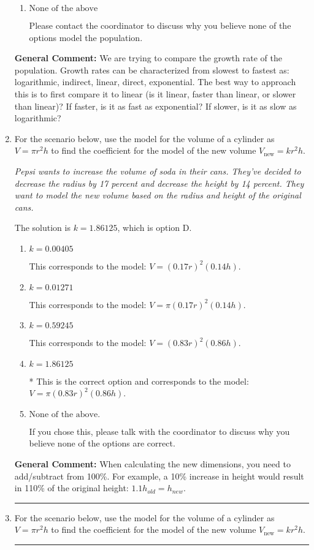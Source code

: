 \documentclass{extbook}[14pt]
\newcommand{\litem}[1]{\item #1

\rule{\textwidth}{0.4pt}}
\begin{document}
\begin{enumerate}
{\begin{enumerate}[label=\Alph*.]
This suggests a growth faster than constant but slower than exponential.
\item \( \text{None of the above} \)

Please contact the coordinator to discuss why you believe none of the options model the population.
\end{enumerate}

\textbf{General Comment:} We are trying to compare the growth rate of the population. Growth rates can be characterized from slowest to fastest as: logarithmic, indirect, linear, direct, exponential. The best way to approach this is to first compare it to linear (is it linear, faster than linear, or slower than linear)? If faster, is it as fast as exponential? If slower, is it as slow as logarithmic?
}
\litem{
For the scenario below, use the model for the volume of a cylinder as $V = \pi r^2 h$ to find the coefficient for the model of the new volume $V_{\text{new}} = k r^2 h$.

\begin{center}
    \textit{ Pepsi wants to increase the volume of soda in their cans. They've decided to decrease the radius by 17 percent and decrease the height by 14 percent. They want to model the new volume based on the radius and height of the original cans. }
\end{center}
The solution is \( k = 1.86125 \), which is option D.\begin{enumerate}[label=\Alph*.]
\item \( k = 0.00405 \)

This corresponds to the model: $V = (0.17 r)^2 (0.14 h)$.
\item \( k = 0.01271 \)

This corresponds to the model: $V = \pi (0.17 r)^2 (0.14 h)$.
\item \( k = 0.59245 \)

This corresponds to the model: $V = (0.83 r)^2 (0.86 h)$.
\item \( k = 1.86125 \)

* This is the correct option and corresponds to the model: $V = \pi (0.83 r)^2 (0.86 h)$.
\item \( \text{None of the above.} \)

If you chose this, please talk with the coordinator to discuss why you believe none of the options are correct.
\end{enumerate}

\textbf{General Comment:} When calculating the new dimensions, you need to add/subtract from 100\%. For example, a 10\% increase in height would result in 110\% of the original height: $1.1h_{old} = h_{new}$.
}
\litem{
For the scenario below, use the model for the volume of a cylinder as $V = \pi r^2 h$ to find the coefficient for the model of the new volume $V_{\text{new}} = k r^2 h$.

}
\end{enumerate}
\end{document}
